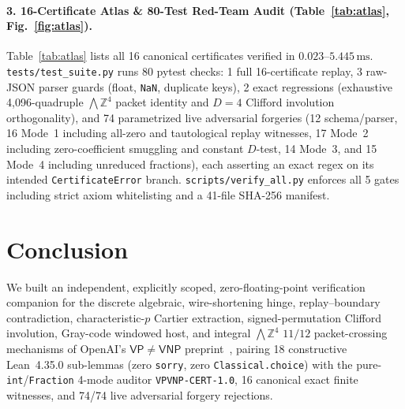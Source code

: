 \documentclass[10pt,twocolumn]{article}
\newcommand{\ZZ}{\mathbb{Z}}
\begin{document}
\paragraph{3. 16-Certificate Atlas \& 80-Test Red-Team Audit (Table~\ref{tab:atlas}, Fig.~\ref{fig:atlas}).}
Table~\ref{tab:atlas} lists all 16 canonical certificates verified in $0.023$--$5.445\,\mathrm{ms}$. \texttt{tests/test\_\allowbreak suite.py} runs 80 pytest checks: 1 full 16-certificate replay, 3 raw-JSON parser guards (float, \texttt{NaN}, duplicate keys), 2 exact regressions (exhaustive 4,096-quadruple $\bigwedge\ZZ^4$ packet identity and $D=4$ Clifford involution orthogonality), and 74 parametrized live adversarial forgeries (12 schema/parser, 16 Mode~1 including all-zero and tautological replay witnesses, 17 Mode~2 including zero-coefficient smuggling and constant $D$-test, 14 Mode~3, and 15 Mode~4 including unreduced fractions), each asserting an exact regex on its intended \texttt{CertificateError} branch. \texttt{scripts/verify\_\allowbreak all.py} enforces all 5 gates including strict axiom whitelisting and a 41-file SHA-256 manifest.

\section{Conclusion}\label{sec:conc}
We built an independent, explicitly scoped, zero-floating-point verification companion for the discrete algebraic, wire-shortening hinge, replay--boundary contradiction, characteristic-$p$ Cartier extraction, signed-permutation Clifford involution, Gray-code windowed host, and integral $\bigwedge\ZZ^4$ $11/12$ packet-crossing mechanisms of OpenAI's $\mathsf{VP}\neq\mathsf{VNP}$ preprint~\cite{openai2026vpvnp}, pairing 18 constructive Lean~4.35.0 sub-lemmas (zero \texttt{sorry}, zero \texttt{Classical.choice}) with the pure-\texttt{int}/\texttt{Fraction} 4-mode auditor \texttt{VPVNP-CERT-1.0}, 16 canonical exact finite witnesses, and 74/74 live adversarial forgery rejections.

{\footnotesize

}
\end{document}
